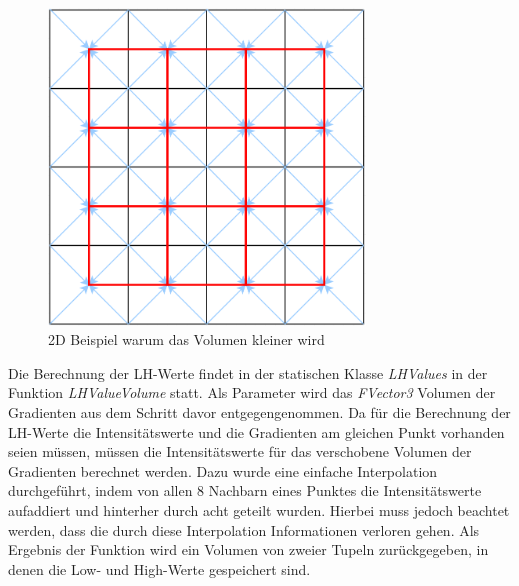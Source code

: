 \begin{figure}
\centering 
\includegraphics[width=0.75\textwidth]{Logos/VoxelShift.png}
\caption{2D Beispiel warum das Volumen kleiner wird} 
\label{fig:shift} 
\end{figure}



Die Berechnung der LH-Werte findet in der statischen Klasse \textit{LHValues} in der Funktion \textit{LHValueVolume} statt. Als Parameter wird das \textit{FVector3} Volumen der Gradienten aus dem Schritt davor entgegengenommen.
Da für die Berechnung der LH-Werte die Intensitätswerte und die Gradienten am gleichen Punkt vorhanden seien müssen, müssen die Intensitätswerte für das verschobene Volumen der Gradienten berechnet werden. Dazu wurde eine einfache Interpolation durchgeführt, indem von allen 8 Nachbarn eines Punktes die Intensitätswerte aufaddiert und hinterher durch acht geteilt wurden. Hierbei muss jedoch beachtet werden, dass die durch diese Interpolation Informationen verloren gehen.
\newline
Als Ergebnis der Funktion wird ein Volumen von zweier Tupeln zurückgegeben, in denen die Low- und High-Werte gespeichert sind.


